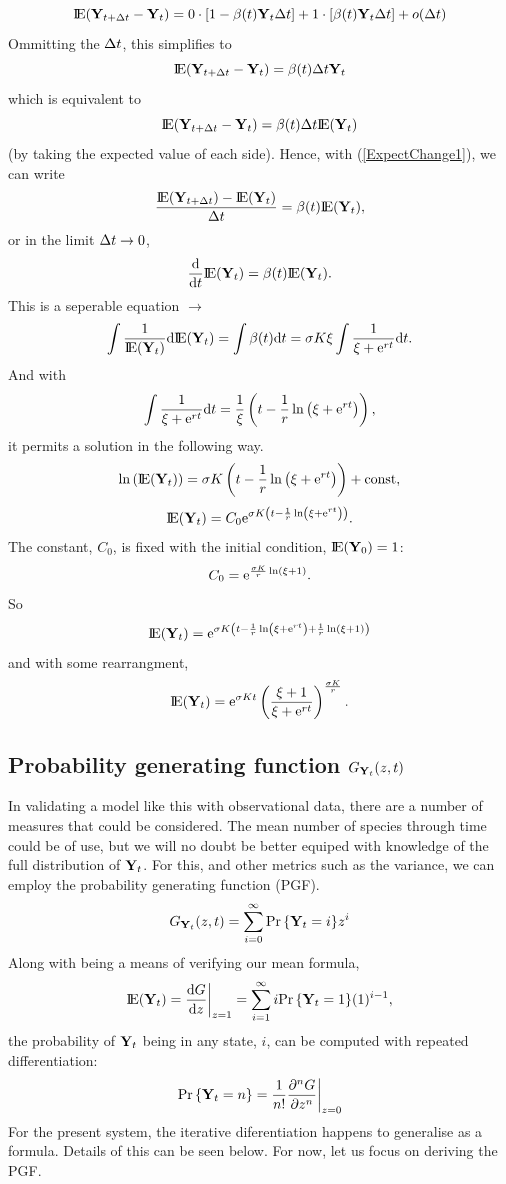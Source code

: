 $$ {\rm I}\!{\rm E}({\bf Y}_{t+\Delta t} - {\bf Y}_t) = 0 \cdot \left[1 -  \beta(t){{\bf Y}_t}\Delta t\right] + 1\cdot \left[\beta(t){{\bf Y}_t}\Delta t\right] + o(\Delta t)$$
Ommitting the $\Delta t$, this simplifies to
$$ {\rm I}\!{\rm E}({\bf Y}_{t+\Delta t} - {\bf Y}_t) =  {\beta(t)\Delta t{{\bf Y}_t}} $$
which is equivalent to 
$$ {\rm I}\!{\rm E}({\bf Y}_{t+\Delta t} - {\bf Y}_t) =  {\beta(t)\Delta t{\rm I}\!{\rm E}({{\bf Y}_t})}$$
(by taking the expected value of each side). Hence, with (\ref{ExpectChange1}), we can write
$$\frac{{\rm I}\!{\rm E}({\bf Y}_{t+\Delta t}) -  {\rm I}\!{\rm E}({{\bf Y}_t})}{\Delta t} =    {\beta(t){\rm I}\!{\rm E}({{\bf Y}_t})},$$
or in the limit $\Delta t \to 0$,
$$\displaystyle\frac{{\rm d} }{{\rm d} t} {\rm I}\!{\rm E}({\bf Y}_t) = \beta(t) {\rm I}\!{\rm E}({{\bf Y}_t}).$$
This is a seperable equation $\to$
$$\int\frac{1}{{\rm I}\!{\rm E}({{\bf Y}_t})}{\rm d} {\rm I}\!{\rm E}({{\bf Y}_t})  = \int \beta(t) {\rm d} t =  \sigma K \xi \int \frac{1}{\xi + {\rm e}^{rt}} {\rm d} t.$$
And with 
\begin{equation}
\label{intBetaT}
\int \frac{1}{\xi + {\rm e}^{rt}} {\rm d} t =\frac{1}{\xi} \left( t - \frac{1}{r} \ln\left(\xi + {\rm e}^{rt}\right) \right),
\end{equation}
it permits a solution in the following way.
$$\ln\left({\rm I}\!{\rm E}({{\bf Y}_t})\right) =  \sigma K\left( t - \frac{1}{r} \ln\left(\xi + {\rm e}^{rt}\right) \right)  + \text{const},$$
$${\rm I}\!{\rm E}({{\bf Y}_t}) = C_0 {\rm e}^{\sigma K\left( t - \frac{1}{r} \ln\left(\xi + {\rm e}^{rt}\right) \right) }.$$
The constant, $C_0$, is fixed with the initial condition, ${\rm I}\!{\rm E}({\bf Y}_0) = 1$:
$$C_0 = {\rm e}^{\frac{\sigma K}{r} \ln\left( \xi+1\right)}.$$
So
$${\rm I}\!{\rm E}({{\bf Y}_t}) = {\rm e}^{\sigma K \left( t - \frac{1}{r} \ln\left(\xi + {\rm e}^{rt}\right) +\frac{1}{r}\ln\left(\xi + 1\right) \right)}$$
and with some rearrangment, 
$${\rm I}\!{\rm E}({{\bf Y}_t}) =  {\rm e}^{\sigma K t} \left(\frac{\xi + 1}{\xi + {\rm e}^{rt}}\right)^{\frac{\sigma K}{r}}.$$ 






\subsection{Probability generating function $G_{{{\bf Y}_t}}(z, t)$}

In validating a model like this with observational data, there are a number of measures that could be considered. The mean number of species through time could be of use, but we will no doubt be better equiped with knowledge of the full distribution of ${{\bf Y}_t}$. For this, and other metrics such as the variance, we can employ the probability generating function (PGF).
$$G_{{{\bf Y}_t}}(z,t) = \sum^{\infty}_{i=0} {\text{Pr}\left\{{{\bf Y}_t} = i\right\}} z^i $$
Along with being a means of verifying our mean formula,
$${\rm I}\!{\rm E}({{\bf Y}_t}) = \displaystyle\frac{{\rm d} G}{{\rm d} z}\bigg|_{z=1} = \sum_{i=1}^{\infty} i {\text{Pr}\left\{{{\bf Y}_t} = 1\right\}} (1)^{i-1},$$
the probability of ${{\bf Y}_t}$ being in any state, $i$, can be computed with repeated differentiation:
\begin{equation}
\label{diston}
{\text{Pr}\left\{{{\bf Y}_t}= n\right\}} = \frac{1}{n!}\frac{\partial^n G}{\partial z^n}\bigg|_{z= 0}
\end{equation}
For the present system, the iterative diferentiation happens to generalise as a formula. Details of this can be seen below. For now, let us focus on deriving the PGF.

